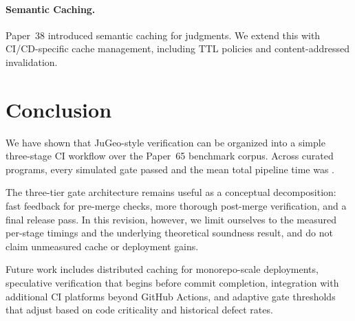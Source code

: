 \documentclass[11pt]{article}
\begin{document}
\paragraph{Semantic Caching.}
Paper~38 introduced semantic caching for \JuGeo{} judgments. We extend this
with CI/CD-specific cache management, including TTL policies and
content-addressed invalidation.

\section{Conclusion}\label{sec:conclusion}

We have shown that JuGeo-style verification can be organized into a simple
three-stage CI workflow over the Paper~65 benchmark corpus. Across
\ppLXVprogramCount{} curated programs, every simulated gate passed and the
mean total pipeline time was \ppLXVtotalMean{}.

The three-tier gate architecture remains useful as a conceptual decomposition:
fast feedback for pre-merge checks, more thorough post-merge verification, and
a final release pass. In this revision, however, we limit ourselves to the
measured per-stage timings and the underlying theoretical soundness result, and
do not claim unmeasured cache or deployment gains.

Future work includes distributed caching for monorepo-scale deployments,
speculative verification that begins before commit completion, integration
with additional CI platforms beyond GitHub Actions, and adaptive gate
thresholds that adjust based on code criticality and historical defect rates.
\end{document}
